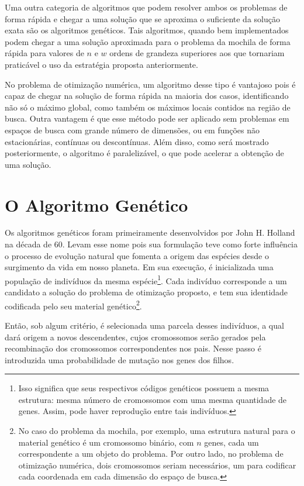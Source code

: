 Uma outra categoria de algoritmos que podem resolver ambos os problemas de forma rápida e chegar a uma
solução que se aproxima o suficiente da solução exata são os algoritmos genéticos. Tais algoritmos,
quando bem implementados podem chegar a uma solução aproximada para o problema da mochila de forma
rápida para valores de $n$ e $w$ ordens de grandeza superiores aos que tornariam praticável o uso da
estratégia proposta anteriormente. 

No problema de otimização numérica, um algoritmo desse tipo é vantajoso pois é capaz de chegar na solução
de forma rápida na maioria dos casos, identificando não só o máximo global, como também os máximos
locais contidos na região de busca. Outra vantagem é que esse método pode ser aplicado sem problemas
em espaços de busca com grande número de dimensões, ou em funções não estacionárias, contínuas ou
descontínuas. Além disso, como será mostrado posteriormente, o algoritmo é paralelizável, o que pode
acelerar a obtenção de uma solução.

\section{O Algoritmo Genético}

Os algoritmos genéticos foram primeiramente desenvolvidos por John H. 
Holland\cite{holland1992ga}\cite{holland_wiki} na década de 60. Levam esse nome pois sua formulação teve como 
forte influência o processo de evolução natural que fomenta a origem das espécies desde o surgimento da vida
em nosso planeta. Em sua execução, é inicializada uma população de indivíduos da mesma espécie\footnote{
  Isso significa que seus respectivos códigos genéticos possuem a mesma estrutura: mesma número de
  cromossomos com uma mesma quantidade de genes. Assim, pode haver reprodução entre tais indivíduos.
}.
Cada indivíduo corresponde a um candidato a solução do problema de otimização proposto, e tem sua
identidade codificada pelo seu material genético\footnote{
  No caso do problema da mochila, por exemplo, uma
  estrutura natural para o material genético é um cromossomo binário, com $n$ genes, cada um correspondente
  a um objeto do problema. Por outro lado, no problema de otimização numérica, dois cromossomos seriam
  necessários, um para codificar cada coordenada em cada dimensão do espaço de busca.
}.

Então, sob algum critério, é selecionada uma parcela desses indivíduos, a qual dará origem a novos
descendentes, cujos cromossomos serão gerados pela recombinação dos cromossomos correspondentes nos
pais. Nesse passo é introduzida uma probabilidade de mutação nos genes dos filhos. 

